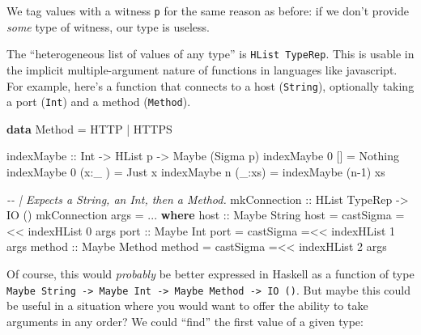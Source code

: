 \documentclass[]{article}
\newenvironment{Shaded}{}{}
\newcommand{\CommentTok}[1]{\textcolor[rgb]{0.38,0.63,0.69}{\textit{#1}}}
\newcommand{\DataTypeTok}[1]{\textcolor[rgb]{0.56,0.13,0.00}{#1}}
\newcommand{\DecValTok}[1]{\textcolor[rgb]{0.25,0.63,0.44}{#1}}
\newcommand{\KeywordTok}[1]{\textcolor[rgb]{0.00,0.44,0.13}{\textbf{#1}}}
\newcommand{\NormalTok}[1]{#1}
\newcommand{\OperatorTok}[1]{\textcolor[rgb]{0.40,0.40,0.40}{#1}}
\newcommand{\OtherTok}[1]{\textcolor[rgb]{0.00,0.44,0.13}{#1}}
\begin{document}
We tag values with a witness \texttt{p} for the same reason as before: if we
don't provide \emph{some} type of witness, our type is useless.

The ``heterogeneous list of values of any type'' is \texttt{HList\ TypeRep}.
This is usable in the implicit multiple-argument nature of functions in
languages like javascript. For example, here's a function that connects to a
host (\texttt{String}), optionally taking a port (\texttt{Int}) and a method
(\texttt{Method}).

\begin{Shaded}
\begin{Highlighting}[]
\KeywordTok{data} \DataTypeTok{Method} \OtherTok{=} \DataTypeTok{HTTP} \OperatorTok{|} \DataTypeTok{HTTPS}

\OtherTok{indexMaybe ::} \DataTypeTok{Int} \OtherTok{{-}>} \DataTypeTok{HList}\NormalTok{ p }\OtherTok{{-}>} \DataTypeTok{Maybe}\NormalTok{ (}\DataTypeTok{Sigma}\NormalTok{ p)}
\NormalTok{indexMaybe }\DecValTok{0}\NormalTok{ []     }\OtherTok{=} \DataTypeTok{Nothing}
\NormalTok{indexMaybe }\DecValTok{0}\NormalTok{ (x}\OperatorTok{:}\NormalTok{\_ ) }\OtherTok{=} \DataTypeTok{Just}\NormalTok{ x}
\NormalTok{indexMaybe n (\_}\OperatorTok{:}\NormalTok{xs) }\OtherTok{=}\NormalTok{ indexMaybe (n}\OperatorTok{{-}}\DecValTok{1}\NormalTok{) xs}

\CommentTok{{-}{-} | Expects a String, an Int, then a Method.}
\OtherTok{mkConnection ::} \DataTypeTok{HList} \DataTypeTok{TypeRep} \OtherTok{{-}>} \DataTypeTok{IO}\NormalTok{ ()}
\NormalTok{mkConnection args }\OtherTok{=} \OperatorTok{...}
  \KeywordTok{where}
\OtherTok{    host ::} \DataTypeTok{Maybe} \DataTypeTok{String}
\NormalTok{    host }\OtherTok{=}\NormalTok{ castSigma }\OperatorTok{=<<}\NormalTok{ indexHList }\DecValTok{0}\NormalTok{ args}
\OtherTok{    port ::} \DataTypeTok{Maybe} \DataTypeTok{Int}
\NormalTok{    port }\OtherTok{=}\NormalTok{ castSigma }\OperatorTok{=<<}\NormalTok{ indexHList }\DecValTok{1}\NormalTok{ args}
\OtherTok{    method ::} \DataTypeTok{Maybe} \DataTypeTok{Method}
\NormalTok{    method }\OtherTok{=}\NormalTok{ castSigma }\OperatorTok{=<<}\NormalTok{ indexHList }\DecValTok{2}\NormalTok{ args}
\end{Highlighting}
\end{Shaded}

Of course, this would \emph{probably} be better expressed in Haskell as a
function of type
\texttt{Maybe\ String\ -\textgreater{}\ Maybe\ Int\ -\textgreater{}\ Maybe\ Method\ -\textgreater{}\ IO\ ()}.
But maybe this could be useful in a situation where you would want to offer the
ability to take arguments in any order? We could ``find'' the first value of a
given type:
\end{document}
